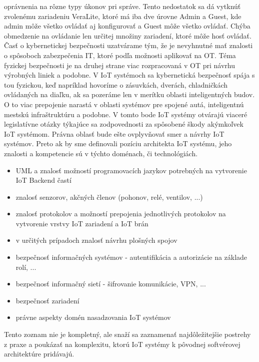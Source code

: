oprávnenia na rôzne typy úkonov pri správe. Tento nedostatok sa dá vytknúť zvolenému zariadeniu VeraLite, ktoré má iba dve úrovne Admin a Guest, kde admin môže všetko ovládať aj konfigurovať a Guest môže všetko ovládať. Chýba obmedzenie na ovládanie len určitej množiny zariadení, ktoré môže hosť ovládať. Časť o kybernetickej bezpečnosti uzatvárame tým, že je nevyhnutné mať znalosti o spôsoboch zabezpečenia IT, ktoré podľa možnosti aplikovať na OT. Téma fyzickej bezpečnosti je na druhej strane viac rozpracovaná v OT pri návrhu výrobných liniek a podobne. V IoT systémoch sa kybernetická bezpečnosť spája s tou fyzickou, keď napríklad hovoríme o zásuvkách, dverách, chladničkách ovládaných na diaľku, ak sa pozeráme len v merítku oblasti inteligentných budov. O to viac prepojenie narastá v oblasti systémov pre spojené autá, inteligentnú mestskú infraštruktúru a podobne. V tomto bode IoT systémy otvárajú viaceré legislatívne otázky týkajúce sa zodpovednosti za spôsobené škody akýmkoľvek IoT systémom. Právna oblasť bude ešte ovplyvňovať smer a návrhy IoT systémov.   
Preto ak by sme definovali pozíciu architekta IoT systému, jeho znalosti a kompetencie sú v týchto doménach, či technológiách.
\begin{itemize}
\item UML a znalosť možností programovacích jazykov potrebných na vytvorenie IoT Backend častí
\item znalosť senzorov, akčných členov (pohonov, relé, ventilov, ...)
\item znalosť protokolov a možností prepojenia jednotlivých protokolov na vytvorenie vrstvy IoT zariadení a IoT brán
\item v určitých prípadoch znalosť návrhu plošných spojov
\item bezpečnosť informačných systémov - autentifikácia a autorizácie na základe rolí, ...
\item bezpečnosť informačný sietí - šifrovanie komunikácie, VPN, ...
\item bezpečnosť zariadení
\item právne aspekty domén nasadzovania IoT systémov
\end{itemize}
Tento zoznam nie je kompletný, ale snaží sa zaznamenať najdôležitejšie postrehy z praxe a poukázať na komplexitu, ktorú IoT systémy k pôvodnej softvérovej architektúre pridávajú.
